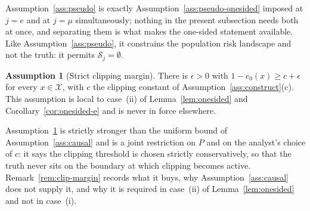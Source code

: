 \documentclass[11pt]{article}
\theoremstyle{plain}
\theoremstyle{definition}
\newtheorem{assumption}{Assumption}
\theoremstyle{remark}
\newcommand{\cX}{\mathcal{X}}
\newcommand{\cS}{\mathcal{S}}
\newcommand{\ez}{e_0}
\begin{document}
\noindent Assumption~\ref{ass:pseudo} is exactly
Assumption~\ref{ass:pseudo-onesided} imposed at $j=e$ and at $j=\mu$
simultaneously; nothing in the present subsection needs both at once, and
separating them is what makes the one-sided statement available. Like
Assumption~\ref{ass:pseudo}, it constrains the population risk landscape and
not the truth: it permits $\cS_j=\emptyset$.

\begin{assumption}[Strict clipping margin]\label{ass:clip-margin}
There is $\epsilon>0$ with $1-\ez(x)\ge c+\epsilon$ for every $x\in\cX$, with
$c$ the clipping constant of Assumption~\ref{ass:construct}(c). This
assumption is local to case~(ii) of Lemma~\ref{lem:onesided} and
Corollary~\ref{cor:onesided-e} and is never in force elsewhere.
\end{assumption}

\noindent Assumption~\ref{ass:clip-margin} is strictly stronger than the uniform
bound of Assumption~\ref{ass:causal} and is a joint restriction on $P$ and on the
analyst's choice of $c$: it says the clipping threshold is chosen strictly
conservatively, so that the truth never sits on the boundary at which clipping
becomes active. Remark~\ref{rem:clip-margin} records what it buys, why
Assumption~\ref{ass:causal} does not supply it, and why it is required in
case~(ii) of Lemma~\ref{lem:onesided} and not in case~(i).
\end{document}
